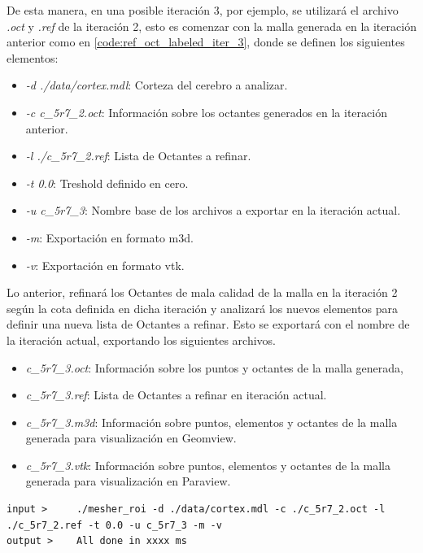 De esta manera, en una posible iteración 3, por ejemplo, se utilizará el archivo \textit{.oct} y \textit{.ref} de la iteración 2, esto es comenzar con la malla generada en la iteración anterior como en \autoref{code:ref_oct_labeled_iter_3}, donde se definen los siguientes elementos:

\begin{itemize}
    \item \textit{-d ./data/cortex.mdl}: Corteza del cerebro a analizar. 
    \item \textit{-c c\_5r7\_2.oct}: Información sobre los octantes generados en la iteración anterior.
    \item \textit{-l ./c\_5r7\_2.ref}: Lista de Octantes a refinar.
    \item \textit{-t 0.0}: Treshold definido en cero.
    \item \textit{-u c\_5r7\_3}: Nombre base de los archivos a exportar en la iteración actual.
    \item \textit{-m}: Exportación en formato m3d.
    \item \textit{-v}: Exportación en formato vtk.
\end{itemize}

Lo anterior, refinará los Octantes de mala calidad de la malla en la iteración 2 según la cota definida en dicha iteración y analizará los nuevos elementos para definir una nueva lista de Octantes a refinar.
Esto se exportará con el nombre de la iteración actual, exportando los siguientes archivos.

\begin{itemize}
    \item \textit{c\_5r7\_3.oct}: Información sobre los puntos y octantes de la malla generada,
    \item \textit{c\_5r7\_3.ref}: Lista de Octantes a refinar en iteración actual.
    \item \textit{c\_5r7\_3.m3d}: Información sobre puntos, elementos y octantes de la malla generada para visualización en Geomview.
    \item \textit{c\_5r7\_3.vtk}: Información sobre puntos, elementos y octantes de la malla generada para visualización en Paraview.
\end{itemize}


\begin{lstlisting}[style=Console,caption={Generador de malla, crea una nueva malla, tomando como input la malla inicial \textit{c\_5r7\_0.oct}, la lista de octantes a refinar \textit{c\_5r7\_0.ref}, la cota de calidad $J_{ENS}$ definido en cero, se exportará la malla con el nombre \textit{c\_5r7\_1}, en formato vtk y m3d.\\ Fuente: Elaboración propia.},label={code:ref_oct_labeled_iter_3}]
input >     ./mesher_roi -d ./data/cortex.mdl -c ./c_5r7_2.oct -l ./c_5r7_2.ref -t 0.0 -u c_5r7_3 -m -v
output >    All done in xxxx ms
\end{lstlisting}


